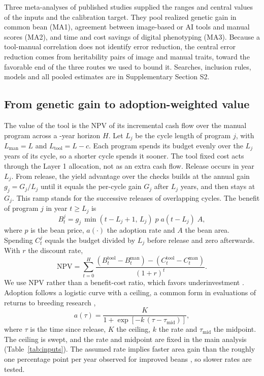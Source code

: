 Three meta-analyses of published studies supplied the ranges and central values of the inputs and the calibration target. They pool realized genetic gain in common bean (MA1), agreement between image-based or AI tools and manual scores (MA2), and time and cost savings of digital phenotyping (MA3). Because a tool-manual correlation does not identify error reduction, the central error reduction comes from heritability pairs of image and manual traits, toward the favorable end of the three routes we used to bound it. Searches, inclusion rules, models and all pooled estimates are in Supplementary Section S2.

\subsection{From genetic gain to adoption-weighted value}
\label{sec:layer2}

The value of the tool is the NPV of its incremental cash flow over the manual program across a \NumCfgHorizon{}-year horizon $H$. Let $L_j$ be the cycle length of program $j$, with $L_{\mathrm{man}} = L$ and $L_{\mathrm{tool}} = L-c$. Each program spends its budget evenly over the $L_j$ years of its cycle, so a shorter cycle spends it sooner. The tool fixed cost acts through the Layer 1 allocation, not as an extra cash flow. Release occurs in year $L_j$. From release, the yield advantage over the checks builds at the annual gain $g_j = G_j/L_j$ until it equals the per-cycle gain $G_j$ after $L_j$ years, and then stays at $G_j$. This ramp stands for the successive releases of overlapping cycles. The benefit of program $j$ in year $t \geq L_j$ is
\begin{equation}
B^{j}_t = g_j\,\min(t-L_j+1,\,L_j)\; p\; a(t-L_j)\; A,
\label{eq:benefit}
\end{equation}
where $p$ is the bean price, $a(\cdot)$ the adoption rate and $A$ the bean area. Spending $C^{j}_t$ equals the budget divided by $L_j$ before release and zero afterwards. With $r$ the discount rate,
\begin{equation}
\mathrm{NPV} = \sum_{t=0}^{H} \frac{\left(B^{\mathrm{tool}}_t - B^{\mathrm{man}}_t\right) - \left(C^{\mathrm{tool}}_t - C^{\mathrm{man}}_t\right)}{(1+r)^{t}}.
\label{eq:npv}
\end{equation}
We use NPV rather than a benefit-cost ratio, which favors underinvestment \citep{Janssen2018Costbenefit}. Adoption follows a logistic curve with a ceiling, a common form in evaluations of returns to breeding research \citep{Grovermann2022Three},
\begin{equation}
a(\tau) = \frac{K}{1 + \exp\left[-k\,(\tau - \tau_{\mathrm{mid}})\right]},
\label{eq:logistic}
\end{equation}
where $\tau$ is the time since release, $K$ the ceiling, $k$ the rate and $\tau_{\mathrm{mid}}$ the midpoint. The ceiling is swept, and the rate and midpoint are fixed in the main analysis (Table~\ref{tab:inputs}). The assumed rate implies faster area gain than the roughly one percentage point per year observed for improved beans \citep{Alene2019Measuring}, so slower rates are tested.

